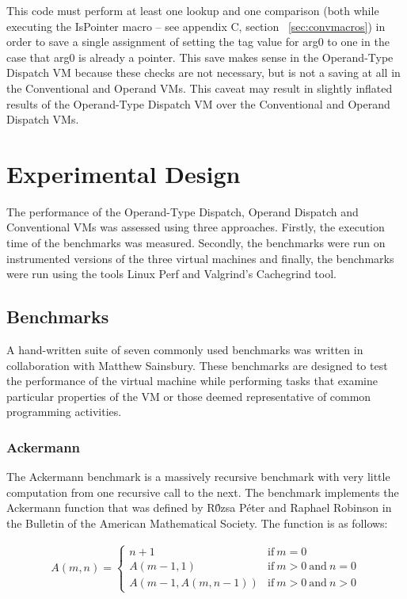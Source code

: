 \documentclass[english,a4paper,12pt]{report}
\begin{document}
This code must perform at least one lookup and one comparison (both
while executing the IsPointer macro -- see appendix C, section ~\ref{sec:convmacros}) in
order to save a single assignment of setting the tag value for arg0 to
one in the case that arg0 is already a pointer. This save makes sense
in the Operand-Type Dispatch VM because these checks are not
necessary, but is not a saving at all in the Conventional and Operand
VMs. This caveat may result in slightly inflated results of the
Operand-Type Dispatch VM over the Conventional and Operand Dispatch
VMs.

\chapter{Experimental Design}

The performance of the Operand-Type Dispatch, Operand Dispatch and
Conventional VMs was assessed using three approaches. Firstly, the
execution time of the benchmarks was measured. Secondly, the
benchmarks were run on instrumented versions of the three virtual
machines and finally, the benchmarks were run using the tools Linux
Perf and Valgrind's Cachegrind \cite{cachegrind} tool.

\section{Benchmarks}

A hand-written suite of seven commonly used benchmarks was written in
collaboration with Matthew Sainsbury. These benchmarks are designed to
test the performance of the virtual machine while performing tasks
that examine particular properties of the VM or those deemed
representative of common programming activities.

\subsection{Ackermann}

The Ackermann benchmark is a massively recursive benchmark with very
little computation from one recursive call to the next. The benchmark
implements the Ackermann function that was defined by R\'{0}zsa P\'{e}ter and
Raphael Robinson \cite{robinson1948} in the Bulletin of the American
Mathematical Society. The function is as follows:

\begin{align*}
\label{eq:ackermann}
A (m, n) = \left\{
\begin{array}{ll}
n + 1          &  \mathrm{if}\ m = 0 \\
A (m - 1, 1)   &  \mathrm{if }\ m > 0 \mathrm{\ and\ } n = 0 \\
A (m - 1, A (m, n - 1))   & \mathrm{if}\ m > 0 \mathrm{\  and\  } n > 0 
\end{array}
\right.
\end{align*}
\end{document}
